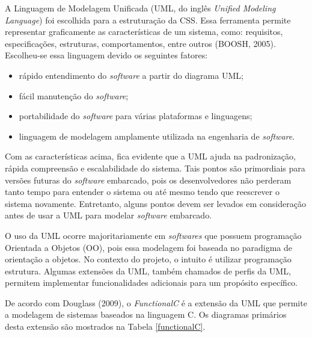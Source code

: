 A Linguagem de Modelagem Unificada (UML, do inglês \textit{Unified Modeling Language}) foi escolhida para a estruturação da CSS. Essa ferramenta permite representar graficamente as características de um sistema, como: requisitos, especificações, estruturas, comportamentos, entre outros (BOOSH, 2005). Escolheu-se essa linguagem devido os seguintes fatores:

\begin{itemize}
	\item rápido entendimento do \textit{software} a partir do diagrama UML;
	
	\item fácil manutenção do \textit{software};
	
	\item portabilidade do \textit{software} para várias plataformas e linguagens;
	
	\item linguagem de modelagem amplamente utilizada na engenharia de \textit{software}.
\end{itemize}


Com as características acima, fica evidente que a UML ajuda na padronização, rápida compreensão e escalabilidade do sistema. Tais pontos são primordiais para versões futuras do \textit{software} embarcado, pois os desenvolvedores não perderam tanto tempo para entender o sistema ou até mesmo tendo que reescrever o sistema novamente. Entretanto, alguns pontos devem ser levados em consideração antes de usar a UML para modelar \textit{software} embarcado.

O uso da UML ocorre majoritariamente em \textit{softwares} que possuem programação Orientada a Objetos (OO), pois essa modelagem foi baseada no paradigma de orientação a objetos. No contexto do projeto, o intuito é utilizar programação estrutura. Algumas extensões da UML, também chamados de perfis da UML, permitem implementar funcionalidades adicionais para um propósito específico.

De acordo com Douglass (2009), o \textit{FunctionalC} é a extensão da UML que permite a modelagem de sistemas baseados na linguagem C. Os diagramas primários desta extensão são mostrados na Tabela \ref{functionalC}. 


